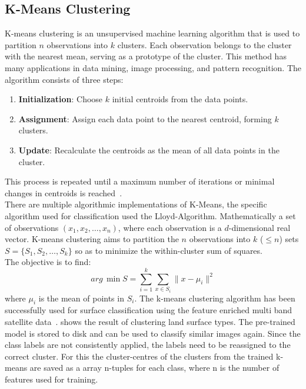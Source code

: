 \documentclass[12pt,a4paper, english,twoside]{scrartcl}
\begin{document}
%
\newpage
  \subsection{K-Means Clustering}\label{sec:kmeans}
    K-means clustering is an unsupervised machine learning algorithm that is used to partition $n$ observations into $k$ clusters. 
    Each observation belongs to the cluster with the nearest mean, serving as a prototype of the cluster. 
    This method has many applications in data mining, image processing, and pattern recognition.
    The algorithm consists of three steps:
    \begin{enumerate}
        \item \textbf{Initialization}: Choose $k$ initial centroids from the data points.
        \item \textbf{Assignment}: Assign each data point to the nearest centroid, forming $k$ clusters.
        \item \textbf{Update}: Recalculate the centroids as the mean of all data points in the cluster. 
    \end{enumerate}
    This process is repeated until a maximum number of iterations or minimal changes in centroids is reached~\autocite{Sinaga2020}.\\ 
    There are multiple algorithmic implementations of K-Means, the specific algorithm used for classification used the Lloyd-Algorithm.
    Mathematically a set of observations $(x_1, x_2, \ldots, x_n)$, where each observation is a $d$-dimensional real vector.
    K-means clustering aims to partition the $n$ observations into $k$ ($\leq n$) sets $S = \{S_1, S_2, \ldots, S_k\}$ so as to minimize the within-cluster sum of squares. \\
    The objective is to find:
    \begin{equation}
        arg\,\min{S} = \sum_{i=1}^{k} \sum_{x \in S_i} \| x - \mu_i \|^2
    \end{equation}
    where $\mu_i$ is the mean of points in $S_i$.
    The k-means clustering algorithm has been successfully used for surface classification using the feature enriched multi band satellite data~\autocite[e.g.]{Burrough2000}.
     shows the result of clustering land surface types. 
    The pre-trained model is stored to disk and can be used to classify similar images again. 
    Since the class labels are not consistently applied, the labels need to be reassigned to the correct cluster.
    For this the cluster-centres of the clusters from the trained k-means are saved as a array n-tuples for each class, where n is the number of features used for training.
    \newpage
\end{document}

